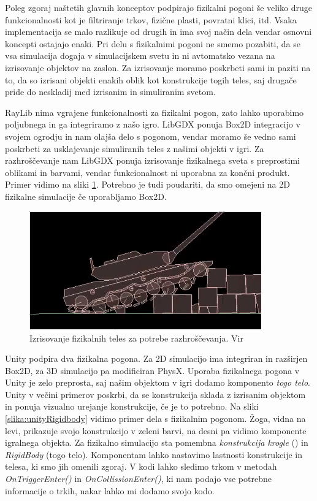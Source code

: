 \documentclass[12pt,a4paper,twoside]{book}
\begin{document}
Poleg zgoraj naštetih glavnih konceptov podpirajo fizikalni pogoni še veliko druge funkcionalnosti kot je filtriranje trkov, fizične plasti, povratni klici, itd. Vsaka implementacija se malo razlikuje od drugih in ima svoj način dela vendar osnovni koncepti ostajajo enaki. Pri delu s fizikalnimi pogoni ne smemo pozabiti, da se vsa simulacija dogaja v simulacijskem svetu in ni avtomatsko vezana na izrisovanje objektov na zaslon. Za izrisovanje moramo poskrbeti sami in paziti na to, da so izrisani objekti enakih oblik kot konstrukcije togih teles, saj drugače pride do neskladij med izrisanim in simuliranim svetom.

RayLib nima vgrajene funkcionalnosti za fizikalni pogon, zato lahko uporabimo poljubnega in ga integriramo z našo igro. LibGDX ponuja Box2D integracijo v svojem ogrodju in nam olajša delo s pogonom, vendar moramo še vedno sami poskrbeti za usklajevanje simuliranih teles z našimi objekti v igri. Za razhroščevanje nam LibGDX ponuja izrisovanje fizikalnega sveta s preprostimi oblikami in barvami, vendar funkcionalnost ni uporabna za končni produkt. Primer vidimo na sliki \ref{slika:box2dDebug}. Potrebno je tudi poudariti, da smo omejeni na 2D fizikalne simulacije če uporabljamo Box2D.

\begin{figure}[h]
	\centering
	\includegraphics[width=10cm]{box2dDebug}
	\caption{Izrisovanje fizikalnih teles za potrebe razhroščevanja. Vir \cite{box2dTank}}
	\label{slika:box2dDebug}
\end{figure}

Unity podpira dva fizikalna pogona. Za 2D simulacijo ima integriran in razširjen Box2D, za 3D simulacijo pa modificiran PhysX. Uporaba fizikalnega pogona v Unity je zelo preprosta, saj našim objektom v igri dodamo komponento \textit{togo telo}. Unity v večini primerov poskrbi, da se konstrukcija sklada z izrisanim objektom in ponuja vizualno urejanje konstrukcije, če je to potrebno. Na sliki \ref{slika:unityRigidbody} vidimo primer dela s fizikalnim pogonom. Žoga, vidna na levi, prikazuje svojo konstrukcijo v zeleni barvi, na desni pa vidimo komponente igralnega objekta. Za fizikalno simulacijo sta pomembna \textit{konstrukcija krogle} () in \textit{RigidBody} (togo telo). Komponentam lahko nastavimo lastnosti konstrukcije in telesa, ki smo jih omenili zgoraj. V kodi lahko sledimo trkom v metodah \textit{OnTriggerEnter()} in \textit{OnCollissionEnter()}, ki nam podajo vse potrebne informacije o trkih, nakar lahko mi dodamo svojo kodo.
\end{document}
